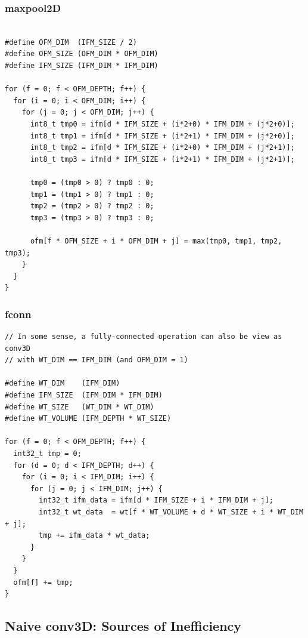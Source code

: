 \documentclass[11pt]{article}
\begin{document}
\subsubsection{maxpool2D}

\begin{verbatim}

#define OFM_DIM  (IFM_SIZE / 2)
#define OFM_SIZE (OFM_DIM * OFM_DIM)
#define IFM_SIZE (IFM_DIM * IFM_DIM)

for (f = 0; f < OFM_DEPTH; f++) {
  for (i = 0; i < OFM_DIM; i++) {
    for (j = 0; j < OFM_DIM; j++) {
      int8_t tmp0 = ifm[d * IFM_SIZE + (i*2+0) * IFM_DIM + (j*2+0)];
      int8_t tmp1 = ifm[d * IFM_SIZE + (i*2+1) * IFM_DIM + (j*2+0)];
      int8_t tmp2 = ifm[d * IFM_SIZE + (i*2+0) * IFM_DIM + (j*2+1)];
      int8_t tmp3 = ifm[d * IFM_SIZE + (i*2+1) * IFM_DIM + (j*2+1)];

      tmp0 = (tmp0 > 0) ? tmp0 : 0;
      tmp1 = (tmp1 > 0) ? tmp1 : 0;
      tmp2 = (tmp2 > 0) ? tmp2 : 0;
      tmp3 = (tmp3 > 0) ? tmp3 : 0;

      ofm[f * OFM_SIZE + i * OFM_DIM + j] = max(tmp0, tmp1, tmp2, tmp3);
    }
  }
}

\end{verbatim}
\subsubsection{fconn}

\begin{verbatim}
// In some sense, a fully-connected operation can also be view as conv3D
// with WT_DIM == IFM_DIM (and OFM_DIM = 1)

#define WT_DIM    (IFM_DIM)
#define IFM_SIZE  (IFM_DIM * IFM_DIM)
#define WT_SIZE   (WT_DIM * WT_DIM)
#define WT_VOLUME (IFM_DEPTH * WT_SIZE)

for (f = 0; f < OFM_DEPTH; f++) {
  int32_t tmp = 0;
  for (d = 0; d < IFM_DEPTH; d++) {
    for (i = 0; i < IFM_DIM; i++) {
      for (j = 0; j < IFM_DIM; j++) {
        int32_t ifm_data = ifm[d * IFM_SIZE + i * IFM_DIM + j];
        int32_t wt_data  = wt[f * WT_VOLUME + d * WT_SIZE + i * WT_DIM + j];
        tmp += ifm_data * wt_data;
      }
    }
  }
  ofm[f] += tmp;
}

\end{verbatim}

\subsection{Naive conv3D: Sources of Inefficiency}
\end{document}
